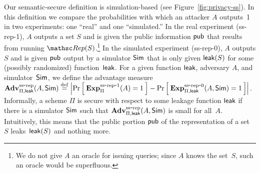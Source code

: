 Our semantic-secure definition is simulation-based (see
Figure~\ref{fig:privacy-ss}).
In this definition we compare the probabilities with which an attacker $A$ outputs~1
in two experiments: one ``real'' and one ``simulated.''
In the real experiment (ss-rep-1), $A$ outputs a set $S$ and is given the
public information ${\sf pub}$ that results from running $\Rep(S)$.\footnote{We do not give $A$ an oracle for
issuing queries; since $A$ knows the set~$S$, such an oracle would be superfluous.
}
In the simulated experiment (ss-rep-0), $A$ outputs $S$ and is given ${\sf pub}$ output
by a simulator ${\sf Sim}$ that is only given ${\sf leak}(S)$ for some (possibly randomized)
function~${\sf leak}$.
 
For a given function ${\sf leak}$, adversary $A$, and simulator~${\sf Sim}$,
we define the advantage measure
$\mathrm{\mathbf{Adv}}^{\mathrm{ss\mbox{-}rep}}_{\Pi,{\sf leak}}(A,{\sf Sim}) \stackrel{\rm def}{=}
\left| \Pr\left[\: \mathrm{\mathbf{Exp}}^{\mathrm{ss\mbox{-}rep\mbox{-}1}}_{\Pi}(A)=1 \:\right] -
\Pr\left[\: \mathrm{\mathbf{Exp}}^{\mathrm{ss\mbox{-}rep\mbox{-}0}}_{\Pi,{\sf leak}}(A, {\sf Sim})=1 \:\right] \right|$.
Informally, a scheme $\Pi$ is secure with respect to some leakage function ${\sf leak}$
if there is a simulator ${\sf Sim}$ such that $\mathrm{\mathbf{Adv}}^{\mathrm{ss\mbox{-}rep}}_{\Pi,{\sf leak}}(A,{\sf Sim})$ is small
for all~$A$. Intuitively, this means that the public portion
${\sf pub}$ of the representation of a set~$S$ leaks~${\sf leak}(S)$ and nothing more.

